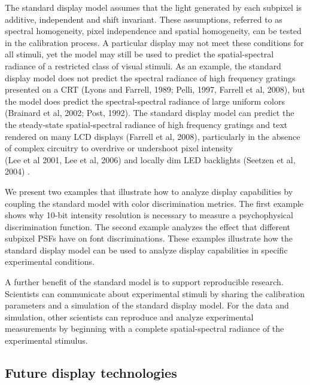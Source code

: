 \documentclass[
  letterpaper,
]{book}
\begin{document}
The standard display model assumes that the light generated by each
subpixel is additive, independent and shift invariant. These
assumptions, referred to as spectral homogeneity, pixel independence and
spatial homogeneity, can be tested in the calibration process. A
particular display may not meet these conditions for all stimuli, yet
the model may still be used to predict the spatial-spectral radiance of
a restricted class of visual stimuli. As an example, the standard
display model does not predict the spectral radiance of high frequency
gratings presented on a CRT (Lyons and Farrell, 1989; Pelli, 1997,
Farrell et al, 2008), but the model does predict the spectral-spectral
radiance of large uniform colors (Brainard et al, 2002; Post, 1992). The
standard display model can predict the the steady-state spatial-spectral
radiance of high frequency gratings and text rendered on many LCD
displays (Farrell et al, 2008), particularly in the absence of complex
circuitry to overdrive or undershoot pixel intensity\\
(Lee et al 2001, Lee et al, 2006) and locally dim LED backlights
(Seetzen et al, 2004) .

We present two examples that illustrate how to analyze display
capabilities by coupling the standard model with color discrimination
metrics. The first example shows why 10-bit intensity resolution is
necessary to measure a psychophysical discrimination function. The
second example analyzes the effect that different subpixel PSFs have on
font discriminations. These examples illustrate how the standard display
model can be used to analyze display capabilities in specific
experimental conditions.

A further benefit of the standard model is to support reproducible
research. Scientists can communicate about experimental stimuli by
sharing the calibration parameters and a simulation of the standard
display model. For the data and simulation, other scientists can
reproduce and analyze experimental measurements by beginning with a
complete spatial-spectral radiance of the experimental stimulus.

\subsection{\texorpdfstring{\textbf{Future display
technologies}}{Future display technologies}}\label{future-display-technologies}
\end{document}
